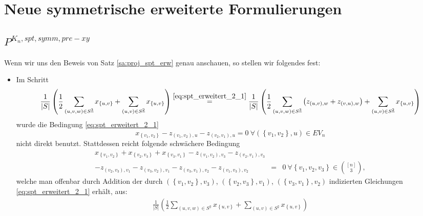 \documentclass[10p,a4paper,BCOR = 12mm, DIV=15]{scrbook}
\begin{document}
\chapter{Neue symmetrische erweiterte Formulierungen}

\section{$P^{K_n, spt, symm, pre-xy}$}

Wenn wir uns den Beweis von Satz \ref{sa:proj_spt_erw} genau anschauen, so stellen wir folgendes fest:
\begin{itemize}
\item Im Schritt
\begin{displaymath}
\frac{1}{\left|S\right|} \left(\frac{1}{2} \sum_{\left(u, v, w\right) \in S^{\underline{3}}} x_{\left\{u, v\right\}} + \sum_{\left(u, v\right) \in S^{\underline{2}}} x_{\left\{u, v\right\}} \right) 
\stackrel{\eqref{eq:spt_erweitert_2_1}}{=} \frac{1}{\left|S\right|} \left(\frac{1}{2} \sum_{\left(u, v, w\right) \in S^{\underline{3}}} \left(z_{\left(u, v\right), w} + z_{\left(v, u\right), w}\right) + \sum_{\left(u, v\right) \in S^{\underline{2}}} x_{\left\{u, v\right\}} \right)
\end{displaymath}
wurde die Bedingung \eqref{eq:spt_erweitert_2_1}
\begin{displaymath}
x_{\left\{v_1, v_2\right\}} - z_{\left(v_1, v_2\right), u} - z_{\left(v_2, v_1\right), u} = 0\ \forall \left(\left\{v_1, v_2\right\}, u\right)\in EV_n
\end{displaymath}
nicht direkt benutzt. Stattdessen reicht folgende schwächere Bedingung
\begin{eqnarray}
x_{\left\{v_1, v_2\right\}} + x_{\left\{v_2, v_3\right\}} + x_{\left\{v_3, v_1\right\}} 
- z_{\left(v_1, v_2\right), v_3} - z_{\left(v_2, v_1\right), v_3} & & \nonumber \\
- z_{\left(v_2, v_3\right), v_1} - z_{\left(v_3, v_2\right), v_1} 
- z_{\left(v_3, v_1\right), v_2} - z_{\left(v_1, v_3\right), v_2}
& = & 0\ \forall \left\{v_1, v_2, v_3\right\}\in {\left[n\right] \choose 3}, \label{eq:erw_symm_eq_neu1}
\end{eqnarray}
welche man offenbar durch Addition der durch $\left(\left\{v_1, v_2\right\}, v_3\right)$, $\left(\left\{v_2, v_3\right\}, v_1\right)$, $\left(\left\{v_3, v_1\right\}, v_2\right)$ indizierten Gleichungen \eqref{eq:spt_erweitert_2_1} erhält, aus:
\begin{eqnarray*}
\frac{1}{\left|S\right|} \left(\frac{1}{2} \sum_{\left(u, v, w\right) \in S^{\underline{3}}} x_{\left\{u, v\right\}} + \sum_{\left(u, v\right) \in S^{\underline{2}}} x_{\left\{u, v\right\}} \right) 

\end{eqnarray*}
\end{itemize}
\end{document}
